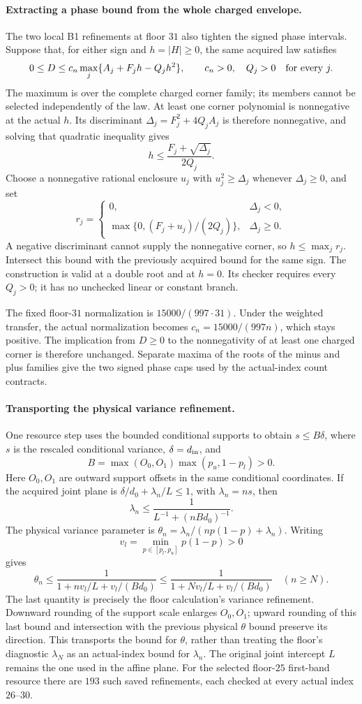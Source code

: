 \paragraph{Extracting a phase bound from the whole charged envelope.}
The two local B1 refinements at floor $31$ also tighten the signed
phase intervals. Suppose that, for either sign and $h=|H|\ge0$,
the same acquired law satisfies
\[
 0\le D\le c_n\max_j\{A_j+F_jh-Q_jh^2\},\qquad
 c_n>0,\quad Q_j>0\quad\hbox{for every }j.
\]
The maximum is over the complete charged corner family; its members
cannot be selected independently of the law. At least one corner
polynomial is nonnegative at the actual $h$. Its discriminant
$\Delta_j=F_j^2+4Q_jA_j$ is therefore nonnegative, and solving that
quadratic inequality gives
\[
 h\le\frac{F_j+\sqrt{\Delta_j}}{2Q_j}.
\]
Choose a nonnegative rational enclosure $u_j$ with
$u_j^2\ge\Delta_j$ whenever $\Delta_j\ge0$, and set
\[
 r_j=\begin{cases}
 0,&\Delta_j<0,\\
 \max\{0,(F_j+u_j)/(2Q_j)\},&\Delta_j\ge0.
 \end{cases}
\]
A negative discriminant cannot supply the nonnegative corner, so
$h\le\max_j r_j$. Intersect this bound with the previously acquired
bound for the same sign. The construction is valid at a double root
and at $h=0$. Its checker requires every $Q_j>0$; it has no unchecked
linear or constant branch.

The fixed floor-$31$ normalization is $15000/(997\cdot31)$.
Under the weighted transfer, the actual normalization becomes
$c_n=15000/(997n)$, which stays positive. The implication from
$D\ge0$ to the nonnegativity of at least one charged corner is
therefore unchanged. Separate maxima of the roots of the minus and
plus families give the two signed phase caps used by the actual-index
count contracts.

\paragraph{Transporting the physical variance refinement.}
One resource step uses the bounded conditional supports to obtain
$s\le B\delta$, where $s$ is the rescaled conditional variance,
$\delta=d_{\rm in}$, and
\[
 B=\max(O_0,O_1)\max(p_u,1-p_l)>0.
\]
Here $O_0,O_1$ are outward support offsets in the same conditional
coordinates. If the acquired joint plane is
$\delta/d_0+\lambda_n/L\le1$, with $\lambda_n=ns$, then
\[
 \lambda_n\le \frac{1}{L^{-1}+(nBd_0)^{-1}}.
\]
The physical variance parameter is
$\theta_n=\lambda_n/(n p(1-p)+\lambda_n)$. Writing
\[
 v_l=\min_{p\in[p_l,p_u]}p(1-p)>0
\]
gives
\[
 \theta_n\le
 \frac{1}{1+n v_l/L+v_l/(Bd_0)}
 \le \frac{1}{1+N v_l/L+v_l/(Bd_0)}
 \quad(n\ge N).
\]
The last quantity is precisely the floor calculation's variance
refinement. Downward rounding of the support scale enlarges $O_0,O_1$;
upward rounding of this last bound and intersection with the previous
physical $\theta$ bound preserve its direction. This transports the
bound for $\theta$, rather than treating the floor's diagnostic
$\lambda_N$ as an actual-index bound for $\lambda_n$.
The original joint intercept $L$ remains the one used in the affine
plane. For the selected floor-$25$ first-band resource there are $193$
such saved refinements, each checked at every actual index $26$--$30$.
